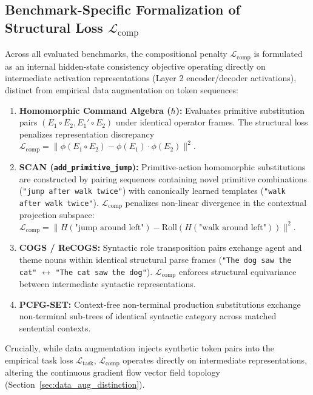 \documentclass{article}
\theoremstyle{plain}
\theoremstyle{definition}
\begin{document}
\subsection{Benchmark-Specific Formalization of Structural Loss \texorpdfstring{$\mathcal{L}_{\text{comp}}$}{L-comp}}
\label{sec:appendix_comp_loss_implementation}
Across all evaluated benchmarks, the compositional penalty $\mathcal{L}_{\text{comp}}$ is formulated as an internal hidden-state consistency objective operating directly on intermediate activation representations (Layer 2 encoder/decoder activations), distinct from empirical data augmentation on token sequences:
\begin{enumerate}[leftmargin=*,noitemsep]
    \item \textbf{Homomorphic Command Algebra ($\hbar$):} Evaluates primitive substitution pairs $(E_1 \circ E_2, E_1' \circ E_2)$ under identical operator frames. The structural loss penalizes representation discrepancy $\mathcal{L}_{\text{comp}} = \| \phi(E_1 \circ E_2) - \phi(E_1) \cdot \phi(E_2) \|^2$.
    \item \textbf{SCAN (\texttt{add\_primitive\_jump}):} Primitive-action homomorphic substitutions are constructed by pairing sequences containing novel primitive combinations (\texttt{"jump after walk twice"}) with canonically learned templates (\texttt{"walk after walk twice"}). $\mathcal{L}_{\text{comp}}$ penalizes non-linear divergence in the contextual projection subspace: $\mathcal{L}_{\text{comp}} = \| H(\text{"jump around left"}) - \text{Roll}(H(\text{"walk around left"})) \|^2$.
    \item \textbf{COGS / ReCOGS:} Syntactic role transposition pairs exchange agent and theme nouns within identical structural parse frames (\texttt{"The dog saw the cat"} $\leftrightarrow$ \texttt{"The cat saw the dog"}). $\mathcal{L}_{\text{comp}}$ enforces structural equivariance between intermediate syntactic representations.
    \item \textbf{PCFG-SET:} Context-free non-terminal production substitutions exchange non-terminal sub-trees of identical syntactic category across matched sentential contexts.
\end{enumerate}
Crucially, while data augmentation injects synthetic token pairs into the empirical task loss $\mathcal{L}_{\text{task}}$, $\mathcal{L}_{\text{comp}}$ operates directly on intermediate representations, altering the continuous gradient flow vector field topology (Section~\ref{sec:data_aug_distinction}).
\end{document}
